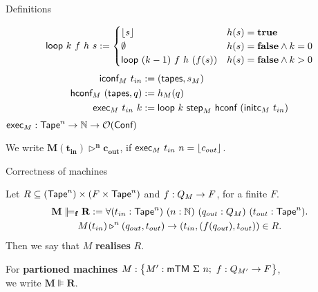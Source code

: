 \begin{frame}{Definitions}
  \begin{definition}[Execution]
    \begin{align*}
      \textsf{loop}~k~f~h~s :=
      \begin{cases}
        \left\lfloor {s}\right\rfloor                  & h(s) = \mathbf{true} \\
        \emptyset                     & h(s) = \mathbf{false} \land k = 0 \\
        \textsf{loop}~(k-1)~f~h~(f(s)) & h(s) = \mathbf{false} \land k > 0
      \end{cases}
    \end{align*}
    \pause%
    \begin{alignat*}{4}
      \textsf{iconf}_M ~ t_{in}          &:= (\textsf{tapes}, s_M) \\
      \textsf{hconf}_M ~ (\textsf{tapes}, q) &:= h_M(q) \\
      \textsf{exec}_M  ~ t_{in}~k        &:= \textsf{loop}~k~\textsf{step}_M~\textsf{hconf}~(\textsf{initc}_M~t_{in})
    \end{alignat*}
    {
      \small
      $\textsf{exec}_M : \textsf{Tape}^n \rightarrow \mathbb{N} \rightarrow \mathcal{O}(\textsf{Conf})$
    }
  \end{definition}

  \pause%
  We write $\mathbf{M(t_{in}) \triangleright^n c_{out}}$, if $\textsf{exec}_M~t_{in}~n= \left\lfloor {c_{out}}\right\rfloor$.
\end{frame}

\begin{frame}{Correctness of machines}
  \begin{definition}
    Let $R \subseteq (\textsf{Tape}^n) \times (F \times \textsf{Tape}^n)$ and $f : Q_M \rightarrow F$, for a finite $F$.\\
    \begin{multline*}
      \mathbf{M \VDash_f R} :=
      \forall (t_{in} : \Tape^n)~(n:\Nat)~(q_{out}:Q_M)~(t_{out} : \Tape^n). \\
      M(t_{in}) \triangleright^n (q_{out}, t_{out}) \rightarrow
      \left(t_{in}, \left(f(q_{out}), t_{out} \right) \right) \in R.
    \end{multline*}
    Then we say that $M$ \textbf{realises} $R$.
  \end{definition}
  \pause%
  For \textbf{partioned machines} $M : \bigl\{ M' : \textsf{mTM}~\Sigma~n;~ f : Q_{M'} \rightarrow F \bigr \}$,\\
  we write $\mathbf{M \VDash R}$.
\end{frame}

